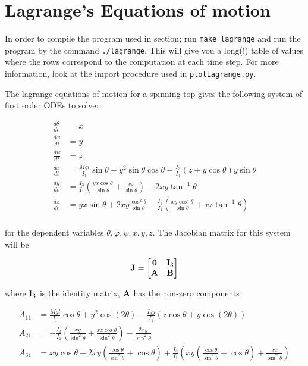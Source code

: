 \section{Lagrange's Equations of motion}

In order to compile the program used in section; run \verb|make lagrange| and run the program by the command \verb|./lagrange|. This will give you a long(!) table of values where the rows correspond to the computation at each time step. For more information, look at the import procedure used in \verb|plotLagrange.py|.

The lagrange equations of motion for a spinning top gives the following system of first order ODEs to solve:

\begin{equation}
  \label{eq:lagrange}
  \begin{split}
    \frac{d \theta}{d t} &= x \\
    \frac{d \varphi}{d t} &= y \\
    \frac{d \psi}{d t} &= z \\
    \frac{d x}{d t} &= \frac{Mgl}{I_1}\sin \theta + y^2 \sin \theta \cos \theta - \frac{I_3}{I_1}(z + y\cos \theta)y\sin \theta \\
    \frac{d y}{d t} &= \frac{I_3}{I_1}( \frac{yx\cos \theta}{\sin \theta} + \frac{xz}{\sin \theta} ) - 2xy\tan^{-1} \theta \\
    \frac{d z}{d t} &= yx\sin \theta + 2xy \frac{\cos^2 \theta}{\sin \theta} - \frac{I_3}{I_1}( \frac{xy \cos^2 \theta}{\sin \theta} + xz\tan^{-1} \theta ) \\
  \end{split}
\end{equation}

for the dependent variables ${\theta,\varphi,\psi,x,y,z}$. The Jacobian matrix for this system will be

\begin{equation}
  \label{eq:lagJac}
  \mathbf{J} =
  \begin{bmatrix}
  \mathbf{0} & \mathbf{I}_3 \\
  \mathbf{A} & \mathbf{B}
  \end{bmatrix}
\end{equation}

where $\mathbf{I}_3$ is the identity matrix, $\mathbf{A}$ has the non-zero components

\begin{equation*}
  \begin{split}
    A_{11} &= \frac{Mgl}{I_1}\cos \theta + y^2 \cos(2\theta) - \frac{I_3 y}{I_1}(z\cos \theta + y \cos(2\theta)) \\
    A_{21} &= -\frac{I_3}{I_1}(\frac{xy}{\sin^2 \theta} + \frac{xz \cos \theta}{\sin^2 \theta}) -\frac{2xy}{\sin^2 \theta} \\
    A_{31} &= xy\cos \theta - 2xy(\frac{\cos \theta}{\sin^2 \theta} + \cos \theta) + \frac{I_3}{I_1}(xy(\frac{\cos \theta}{\sin^2 \theta} + \cos \theta)+ \frac{xz}{\sin^2 \theta} )
  \end{split}
\end{equation*}

